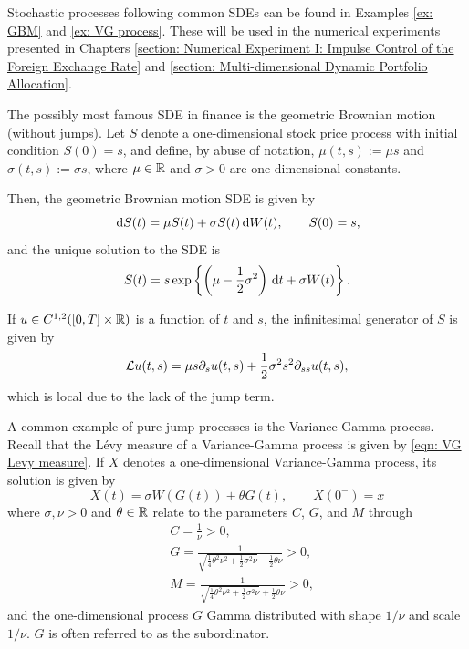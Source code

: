 Stochastic processes following common SDEs can be found in Examples \ref{ex: GBM} and \ref{ex: VG process}. These will be used in the numerical experiments presented in Chapters \ref{section: Numerical Experiment I: Impulse Control of the Foreign Exchange Rate} and \ref{section: Multi-dimensional Dynamic Portfolio Allocation}.
\begin{example}
\label{ex: GBM}
    The possibly most famous SDE in finance is the geometric Brownian motion (without jumps). Let $S$ denote a one-dimensional stock price process with initial condition $S(0)=s$, and define, by abuse of notation, $\mu(t,s) := \mu s$ and $\sigma(t,s):=\sigma s$, where $\mu \in \mathbb{R}$ and $\sigma>0$ are one-dimensional constants.
    
    Then, the geometric Brownian motion SDE is given by 
    \begin{equation*}
        \,\mathrm{d} S(t) = \mu S(t) + \sigma S(t) \,\mathrm{d} W(t), \qquad S(0)=s,
    \end{equation*}
    and the unique solution to the SDE is
    \begin{equation*}
        S(t) = s \exp\left\{\left(\mu - \frac{1}{2}\sigma^2 \right) \,\mathrm{d} t + \sigma W(t)\right\}. 
    \end{equation*}

    If $u\in C^{1,2}([0,T] \times \mathbb{R})$ is a function of $t$ and $s$, the infinitesimal generator of $S$ is given by
    \begin{equation*}
        \mathcal{L} u(t,s) = \mu s \partial_su(t,s) + \frac{1}{2} \sigma^2 s^2 \partial_{ss} u(t,s),
    \end{equation*}
    which is local due to the lack of the jump term.  
\end{example}
\begin{example}
\label{ex: VG process}
    A common example of pure-jump processes is the Variance-Gamma process. Recall that the Lévy measure of a Variance-Gamma process is given by \eqref{eqn: VG Levy measure}. If $X$ denotes a one-dimensional Variance-Gamma process, its solution is given by
    \begin{equation*}
        X(t) = \sigma W(G(t)) + \theta G(t), \qquad X(0^-) = x
    \end{equation*}
    where $\sigma, \nu > 0$ and $\theta \in \mathbb{R}$ relate to the parameters $C$, $G$, and $M$ through
    \begin{align*}
        & C = \frac{1}{\nu} > 0,\\
        & G = \frac{1}{\sqrt{\frac{1}{4} \theta^2 \nu^2 + \frac{1}{2}\sigma^2\nu} - \frac{1}{2}\theta\nu} > 0, \\
        & M = \frac{1}{\sqrt{\frac{1}{4} \theta^2 \nu^2 + \frac{1}{2}\sigma^2\nu} + \frac{1}{2}\theta\nu} > 0,
    \end{align*}
    and the one-dimensional process $G$ Gamma distributed with shape $1/\nu$ and scale $1/\nu$. $G$ is often referred to as the subordinator. 
\end{example}

